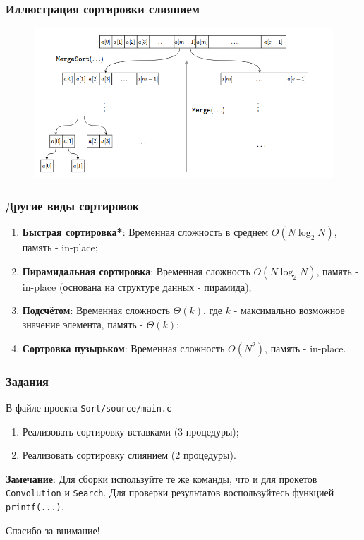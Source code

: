 \documentclass{beamer}
\begin{document}
    \begin{frame}
        \frametitle{Иллюстрация сортировки слиянием}
        \begin{figure}[!tbp]
           \centering
           \includegraphics[width=\textwidth]{pics/sort.png}
       \end{figure}
    \end{frame}
    \begin{frame}
        \frametitle{Другие виды сортировок}
        \begin{enumerate}
            \justifying
            \item {\bf Быстрая сортировка*}: Временная сложность в среднем $O(N\log_{2}{N})$, память - in-place;
            \item {\bf Пирамидальная сортировка}: Временная сложность $O(N\log_{2}{N})$, память - in-place (основана на структуре данных - пирамида);
            \item {\bf Подсчётом}:  Временная сложность $\Theta(k)$, где $k$ - максимально возможное значение элемента, память -  $\Theta(k)$;
            \item {\bf Сортровка пузырьком}:  Временная сложность $O(N^{2})$,  память - in-place.
        \end{enumerate}
    \end{frame}
    \begin{frame}[fragile]
        \frametitle{Задания}
        \justifying
        В файле проекта {\tt Sort/source/main.c}
        \begin{enumerate}
            \item Реализовать сортировку вставками (3 процедуры);
            \item Реализовать сортировку слиянием (2 процедуры).
        \end{enumerate}
        \vspace{1cm}
        \par
        \justifying
        {\bf Замечание}: Для сборки используйте те же команды, что и для прокетов {\tt Convolution} и {\tt Search}. Для проверки результатов воспользуйтесь функцией {\tt printf(...)}.
    \end{frame}
    \begin{frame}
        \begin{center}
        \baselineskip 20.0mm
        \Huge Спасибо за внимание!
        \end{center}
    \end{frame}
\end{document}
